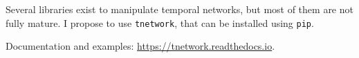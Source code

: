 \documentclass[addpoints]{exam}
\newcommand{\code}[1]{\colorbox{light-gray}{\texttt{#1}}}
\begin{document}
\begin{center}
\end{center}




\begin{tcolorbox}[colback=black!5!white,colframe=white!75!black]
Several libraries exist to manipulate temporal networks, but most of them are not fully mature. I propose to use \code{tnetwork}, that can be installed using \code{pip}. 

Documentation and examples: \url{https://tnetwork.readthedocs.io}.

\end{tcolorbox}
\end{document}
